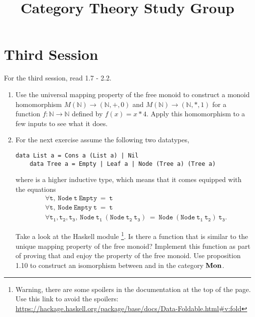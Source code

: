\documentclass{scrartcl}
\title{Category Theory Study Group}
\date{}
\begin{document}
\maketitle

\section*{Third Session}
For the third session, read 1.7 - 2.2.

\begin{enumerate}

\item
  Use the universal mapping property of the free monoid to construct a monoid homomorphism $M(\mathbb{N}) \rightarrow (\mathbb{N},+,0)$ and $M(\mathbb{N}) \rightarrow (\mathbb{N},\ast,1)$ for a function $f: \mathbb{N} \rightarrow \mathbb{N}$ defined by $f(x) = x \ast 4$. Apply this homomorphism to a few inputs to see what it does.

\item
  For the next exercise assume the following two datatypes,
  \begin{lstlisting}[gobble=4]
    data List a = Cons a (List a) | Nil
    data Tree a = Empty | Leaf a | Node (Tree a) (Tree a)
  \end{lstlisting}
  where  is a higher inductive type, which means that it comes equipped with the equations
  \begin{align}
  &\forall\mathtt{t,\ Node\ t\ Empty\ =\ t} \\
  &\forall\mathtt{t,\ Node\ Empty\ t\ =\ t} \\
  &\forall\mathtt{t_1,t_2,t_3,\ Node\ t_1\ (Node\ t_2\ t_3)\ =\ Node\ (Node\ t_1\ t_2)\ t_3}.
  \end{align}
  
  Take a look at the Haskell module \footnote{Warning, there are some spoilers in the documentation at the top of the page. Use this link to avoid the spoilers: \url{https://hackage.haskell.org/package/base/docs/Data-Foldable.html\#v:fold}}.
  Is there a function that is similar to the unique mapping property of the free monoid?
  Implement this function as part of proving that  and  enjoy the property of the free monoid.
  Use proposition 1.10 to construct an isomorphism between  and  in the category $\mathbf{Mon}$.


\end{enumerate}
\end{document}
